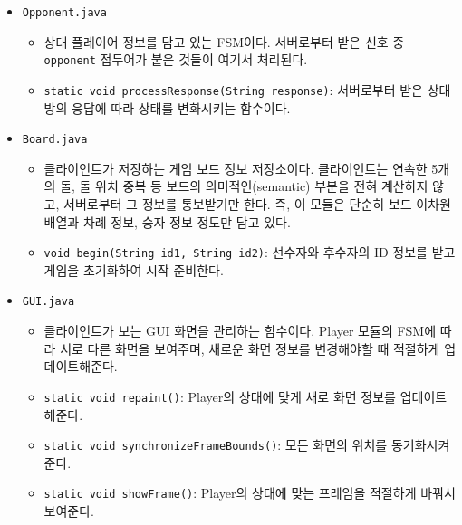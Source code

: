 \documentclass[a4paper, 10pt]{article}
\begin{document}
\begin{itemize}
\begin{itemize}
  \end{itemize}
  \item \texttt{Opponent.java}
  \begin{itemize}
    \item[] 상대 플레이어 정보를 담고 있는 FSM이다. 서버로부터 받은 신호 중 \texttt{opponent} 접두어가 붙은 것들이 여기서 처리된다.
    \item \texttt{static void processResponse(String response)}: 서버로부터 받은 상대방의 응답에 따라 상태를 변화시키는 함수이다.
  \end{itemize}
  \item \texttt{Board.java}
  \begin{itemize}
    \item[] 클라이언트가 저장하는 게임 보드 정보 저장소이다. 클라이언트는 연속한 5개의 돌, 돌 위치 중복 등
    보드의 의미적인(semantic) 부분을 전혀 계산하지 않고, 서버로부터 그 정보를 통보받기만 한다.
    즉, 이 모듈은 단순히 보드 이차원 배열과 차례 정보, 승자 정보 정도만 담고 있다.
    \item \texttt{void begin(String id1, String id2)}: 선수자와 후수자의 ID 정보를 받고 게임을 초기화하여 시작 준비한다.
  \end{itemize}
  \item \texttt{GUI.java}
  \begin{itemize}
    \item[] 클라이언트가 보는 GUI 화면을 관리하는 함수이다. Player 모듈의 FSM에 따라 서로 다른 화면을 보여주며,
    새로운 화면 정보를 변경해야할 때 적절하게 업데이트해준다.
    \item \texttt{static void repaint()}: Player의 상태에 맞게 새로 화면 정보를 업데이트해준다.
    \item \texttt{static void synchronizeFrameBounds()}: 모든 화면의 위치를 동기화시켜준다.
    \item \texttt{static void showFrame()}: Player의 상태에 맞는 프레임을 적절하게 바꿔서 보여준다.
  \end{itemize}
\end{itemize}
\end{document}
